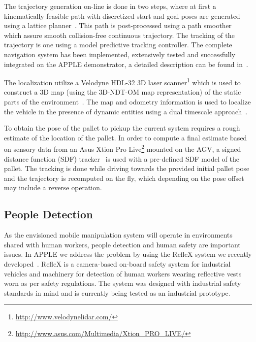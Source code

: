 The trajectory generation on-line is done in two steps, where at first a kinematically feasible path
with discretized start and goal poses are generated using a lattice planner~\cite{Ciri14}. This path
is post-processed using a path smoother~\cite{Andr15} which assure smooth collision-free continuous
trajectory. The tracking of the trajectory is one using a model predictive tracking controller. The
complete navigation system has been implemented, extensively tested and successfully integrated on
the APPLE demonstrator, a detailed description can be found in~\cite{Andr15}.

The localization utilize a Velodyne HDL-32 3D laser
scanner\footnote{\url{http://www.velodynelidar.com/}} which is used to construct a 3D map (using the
3D-NDT-OM map representation) of the static parts of the environment~\cite{Stoy13}. The map and
odometry information is used to localize the vehicle in the presence of dynamic entities using a
dual timescale approach~\cite{Vale14}.

To obtain the pose of the pallet to pickup the current system requires a rough estimate of the
location of the pallet. In order to compute a final estimate based on sensory data from an Asus
Xtion Pro Live\footnote{\url{http://www.asus.com/Multimedia/Xtion_PRO_LIVE/}} mounted on the AGV, a
signed distance function (SDF) tracker~\cite{Cane13} is used with a pre-defined SDF model of the
pallet. The tracking is done while driving towards the provided initial pallet pose and the
trajectory is recomputed on the fly, which depending on the pose offset may include a reverse
operation.
%
\subsection{People Detection}
\label{subsec:people_det}
%
As the envisioned mobile manipulation system will operate in environments shared with human workers,
people detection and human safety are important issues. In APPLE we address the problem by using the
RefleX system we recently developed~\cite{Mosb14}. RefleX is a camera-based on-board safety system
for industrial vehicles and machinery for detection of human workers wearing reflective vests worn
as per safety regulations. The system was designed with industrial safety standards in mind and is
currently being tested as an industrial prototype.
%

